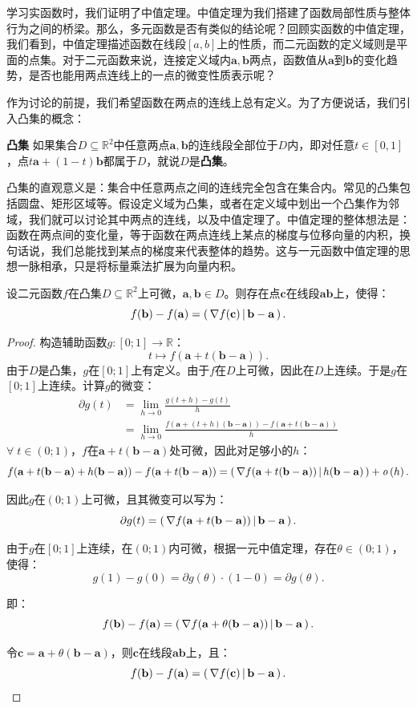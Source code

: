 \documentclass[12pt,UTF8]{ctexbook}
\begin{document}
学习实函数时，我们证明了中值定理。中值定理为我们搭建了函数局部性质与整体行为之间的桥梁。那么，多元函数是否有类似的结论呢？回顾实函数的中值定理，我们看到，中值定理描述函数在线段$[a,b]$上的性质，而二元函数的定义域则是平面的点集。对于二元函数来说，连接定义域内$\mathbf{a}, \mathbf{b}$两点，函数值从$\mathbf{a}$到$\mathbf{b}$的变化趋势，是否也能用两点连线上的一点的微变性质表示呢？

作为讨论的前提，我们希望函数在两点的连线上总有定义。为了方便说话，我们引入凸集的概念：
\begin{df}{\textbf{凸集}}
如果集合$D\subseteq \mathbb{R}^2$中任意两点$\mathbf{a},\mathbf{b}$的连线段全部位于$D$内，即对任意$t\in[0,1]$，点$t\mathbf{a}+(1-t)\mathbf{b}$都属于$D$，就说$D$是\textbf{凸集}。
\end{df}

凸集的直观意义是：集合中任意两点之间的连线完全包含在集合内。常见的凸集包括圆盘、矩形区域等。假设定义域为凸集，或者在定义域中划出一个凸集作为邻域，我们就可以讨论其中两点的连线，以及中值定理了。中值定理的整体想法是：函数在两点间的变化量，等于函数在两点连线上某点的梯度与位移向量的内积，换句话说，我们总能找到某点的梯度来代表整体的趋势。这与一元函数中值定理的思想一脉相承，只是将标量乘法扩展为向量内积。

\begin{tm}
设二元函数$f$在凸集$D\subseteq \mathbb{R}^2$上可微，$\mathbf{a},\mathbf{b}\in D$。则存在点$\mathbf{c}$在线段$\mathbf{ab}$上，使得：
$$f(\mathbf{b})-f(\mathbf{a})=\displaystyle\left( \,\nabla f(\mathbf{c}) \,\middle\vert \,\mathbf{b}-\mathbf{a} \,\right).$$
\end{tm}

\begin{proof}
构造辅助函数$g:[0;1]\to\mathbb{R}$：
$$t \mapsto f(\mathbf{a}+t(\mathbf{b}-\mathbf{a})).$$
由于$D$是凸集，$g$在$[0;1]$上有定义。由于$f$在$D$上可微，因此在$D$上连续。于是$g$在$[0;1]$上连续。计算$g$的微变：
\begin{align*}
\partial g(t)&=\lim_{h\to 0}\frac{g(t+h)-g(t)}{h}\\
&=\lim_{h\to 0}\frac{f(\mathbf{a}+(t+h)(\mathbf{b}-\mathbf{a}))-f(\mathbf{a}+t(\mathbf{b}-\mathbf{a}))}{h}
\end{align*}
$\forall \; t\in(0;1)$，$f$在$\mathbf{a}+t(\mathbf{b}-\mathbf{a})$处可微，因此对足够小的$h$：
$$f(\mathbf{a}+t(\mathbf{b}-\mathbf{a})+h(\mathbf{b}-\mathbf{a}))-f(\mathbf{a}+t(\mathbf{b}-\mathbf{a}))=\displaystyle\left( \,\nabla f(\mathbf{a}+t(\mathbf{b}-\mathbf{a})) \,\middle\vert \,h(\mathbf{b}-\mathbf{a}) \,\right)+\mathit{o}\left(h\right).$$

因此$g$在$(0;1)$上可微，且其微变可以写为：
$$\partial g(t)=\displaystyle\left( \,\nabla f(\mathbf{a}+t(\mathbf{b}-\mathbf{a})) \,\middle\vert \,\mathbf{b}-\mathbf{a} \,\right).$$

由于$g$在$[0;1]$上连续，在$(0;1)$内可微，根据一元中值定理，存在$\theta\in(0;1)$，使得：
$$g(1)-g(0)=\partial g(\theta)\cdot(1-0) = \partial g(\theta).$$

即：
$$f(\mathbf{b})-f(\mathbf{a})=\displaystyle\left( \,\nabla f(\mathbf{a}+\theta(\mathbf{b}-\mathbf{a})) \,\middle\vert \,\mathbf{b}-\mathbf{a} \,\right).$$

令$\mathbf{c}=\mathbf{a}+\theta(\mathbf{b}-\mathbf{a})$，则$\mathbf{c}$在线段$\mathbf{ab}$上，且：
$$f(\mathbf{b})-f(\mathbf{a})=\displaystyle\left( \,\nabla f(\mathbf{c}) \,\middle\vert \,\mathbf{b}-\mathbf{a} \,\right).$$
\end{proof}
\end{document}
